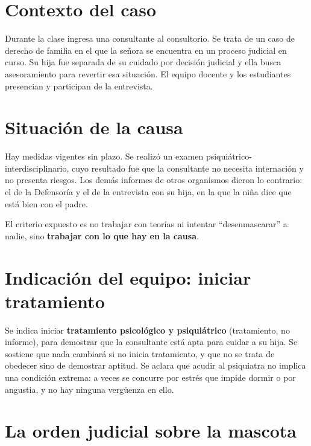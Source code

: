 \documentclass[12pt,oneside]{book}
\begin{document}
\section{Contexto del caso}

Durante la clase ingresa una consultante al consultorio. Se trata de un caso de derecho de familia en el que la señora se encuentra en un proceso judicial en curso. Su hija fue separada de su cuidado por decisión judicial y ella busca asesoramiento para revertir esa situación. El equipo docente y los estudiantes presencian y participan de la entrevista.

\section{Situación de la causa}

Hay medidas vigentes sin plazo. Se realizó un examen psiquiátrico-interdisciplinario, cuyo resultado fue que la consultante no necesita internación y no presenta riesgos. Los demás informes de otros organismos dieron lo contrario: el de la Defensoría y el de la entrevista con su hija, en la que la niña dice que está bien con el padre.

\begin{note}
El criterio expuesto es no trabajar con teorías ni intentar ``desenmascarar'' a nadie, sino \textbf{trabajar con lo que hay en la causa}.
\end{note}


\section{Indicación del equipo: iniciar tratamiento}

Se indica iniciar \textbf{tratamiento psicológico y psiquiátrico} (tratamiento, no informe), para demostrar que la consultante está apta para cuidar a su hija. Se sostiene que nada cambiará si no inicia tratamiento, y que no se trata de obedecer sino de demostrar aptitud. Se aclara que acudir al psiquiatra no implica una condición extrema: a veces se concurre por estrés que impide dormir o por angustia, y no hay ninguna vergüenza en ello.

\section{La orden judicial sobre la mascota}
\end{document}
